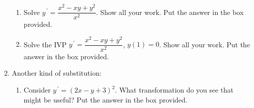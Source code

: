 \documentclass{ximera}
\begin{document}
\begin{enumerate}
\begin{enumerate}

\item  Solve $y^{\,\prime}=\dfrac{x^{2}-xy+y^{2}}{x^{2}}$.  Show all your work. Put the answer in the box provided.




\hfill{}\fbox{ \begin{minipage}{3in}\vspace{0.25in}\hfill\vspace{0.25in} \end{minipage}}








\vfill
\vfill


\item  Solve the IVP $y^{\,\prime}=\dfrac{x^{2}-xy+y^{2}}{x^{2}}$, $y(1)=0$.  Show all your work. Put the answer in the box provided.




\hfill{}\fbox{ \begin{minipage}{3in}\vspace{0.25in}\hfill\vspace{0.25in} \end{minipage}}


\vfill


\end{enumerate}

\newpage

\item Another kind of substitution:



\begin{enumerate}

\item Consider $y^{\,\prime}=(2x-y+3)^{2}$.  What transformation do you see that might be useful?  Put the answer in the box provided.




\hfill{}

\vfill


\end{enumerate}
\end{enumerate}
\end{document}
